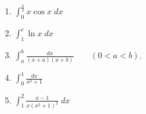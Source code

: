 \begin{ejercicio}
\begin{enumerate}
        \item $\displaystyle \int_0^{\frac{\pi}{2}} x\cos x\;dx$

        \item $\displaystyle \int_1^e \ln x\;dx$

        \item $ \displaystyle \int_a^b \frac{dx}{(x+a)(x+b)} \qquad (0<a<b)$.
        \begin{comment}
        \begin{equation*}
            \int_a^b \frac{dx}{(x+a)(x+b)} = \int_a^b \frac{A}{x+a}dx + \int_a^b\frac{B}{x+b}dx = \frac{1}{b-a}\int_a^b \frac{dx}{x+a} - \frac{1}{b-a}\int_a^b \frac{dx}{x+b} = \left[\frac{1}{b-a}\ln |x+a| -\frac{1}{b-a}\ln |x+b|\right]^b_a = \left[\frac{1}{b-a}\ln \left|\frac{x+a}{x+b}\right|\right]^b_a = \frac{1}{b-a}\left(\ln\left(\frac{b+a}{2b}\right)-\ln\left(\frac{2a}{a+b}\right)\right)
        \end{equation*}

        Aplico el método de los coeficientes indeterminados:
        \begin{equation*}
            A(x+b) +B(x+a)=1
        \end{equation*}
        \end{comment}

        \item $\displaystyle \int_0^1 \frac{dx}{x^3+1}$

        \begin{comment}
        \begin{equation*}
            \int_0^1 \frac{dx}{x^3+1}= \int_0^1 \frac{dx}{(x+1)\left[\left(x-\frac{1}{2}\right)^2\right]}
        \end{equation*}
        \end{comment}
        

        \item $\displaystyle \int_1^2 \frac{x-1}{x(x^2+1)^2}\;dx$
    \end{enumerate}
\end{ejercicio}

